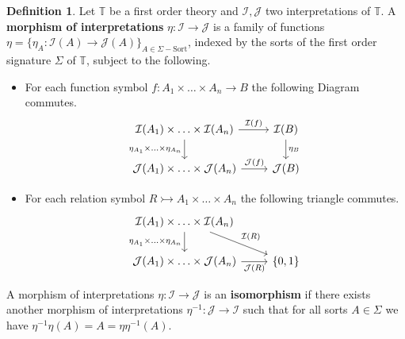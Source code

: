 \documentclass[12pt]{article}
\theoremstyle{plain}
\theoremstyle{definition}
\newtheorem{defn}[thm]{Definition} %
\newcommand{\bb}[1]{\mathbb{#1}}
\newcommand{\call}[1]{\mathcal{#1}}
\newcommand{\lto}{\longrightarrow}
\begin{document}
	\begin{defn}
		Let $\bb{T}$ be a first order theory and $\call{I}, \call{J}$ two interpretations of $\bb{T}$. A \textbf{morphism of interpretations} $\eta: \call{I} \lto \call{J}$ is a family of functions $ \eta = \{  \eta_{A}: \call{I}(A) \lto \call{J}(A)\}_{A \in \Sigma-\text{Sort}}$, indexed by the sorts of the first order signature $\Sigma$ of $\bb{T}$, subject to the following.
		\begin{itemize}
			\item For each function symbol $f: A_1 \times \ldots \times A_n \lto B$ the following Diagram commutes.
			\begin{equation}\label{eq:function}
				\begin{tikzcd}
					\call{I}(A_1) \times \ldots \times \call{I}(A_n)\arrow[r,"{\call{I}(f)}"]\arrow[d,swap,"{\eta_{A_1} \times \ldots \times \eta_{A_n}}"] & \call{I}(B)\arrow[d,"{\eta_{B}}"]\\
					\call{J}(A_1) \times \ldots \times \call{J}(A_n)\arrow[r,"{\call{J}(f)}"] & \call{J}(B)
					\end{tikzcd}
				\end{equation}
		\item For each relation symbol $R \rightarrowtail A_1 \times \ldots \times A_n$ the following triangle commutes.
		\begin{equation}
			\begin{tikzcd}\label{eq:relation}
				\call{I}(A_1) \times \ldots \times \call{I}(A_n)\arrow[d,swap,"{\eta_{A_1} \times \ldots \times \eta_{A_n}}"]\arrow[dr,"{\call{I}(R)}"]\\
				\call{J}(A_1) \times \ldots \times \call{J}(A_n)\arrow[r,swap,"{\call{J}(R)}"] & \{ 0,1 \} 
				\end{tikzcd}
			\end{equation}
		\end{itemize}
	A morphism of interpretations $\eta: \call{I} \lto \call{J}$ is an \textbf{isomorphism} if there exists another morphism of interpretations $\eta^{-1}: \call{J} \lto \call{I}$ such that for all sorts $A \in \Sigma$ we have $\eta^{-1}\eta(A) = A = \eta\eta^{-1}(A)$.
		\end{defn}
	
\end{document}
